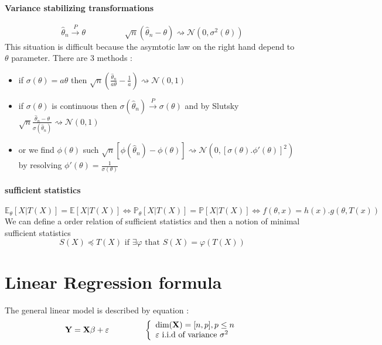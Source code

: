 \documentclass[a4paper,10pt]{article}
\begin{document}
\paragraph{Variance stabilizing transformations}
\[
\widehat{\theta}_n \xrightarrow{P} \theta
\hspace{2cm}
\sqrt{n}(\widehat{\theta}_n - \theta) \rightsquigarrow   \mathcal{N}(0,\sigma^{2}(\theta))
\]
This situation is difficult because the asymtotic law on the right hand depend to $\theta$ parameter. There are 3 methods :
\begin{itemize}
 \item if $\sigma(\theta)=a\theta$ then $\sqrt{n}(\frac{\widehat{\theta}_n}{a\theta} - \frac{1}{a}) \rightsquigarrow   \mathcal{N}(0,1)$
 \item if $\sigma(\theta)$ is continuous then $\sigma(\widehat{\theta}_n) \xrightarrow{P} \sigma(\theta)$ and by Slutsky
$\sqrt{n}\frac{\widehat{\theta}_n - \theta}{\sigma(\widehat{\theta}_n)} \rightsquigarrow   \mathcal{N}(0,1)$
 \item or we find $\phi(\theta)$ such $\sqrt{n}[\phi(\widehat{\theta}_n) - \phi(\theta)] \rightsquigarrow   \mathcal{N}(0,[\sigma(\theta).\phi'(\theta)]^2)$
by resolving $\phi'(\theta) = \frac{1}{\sigma(\theta)}$
\end{itemize}
\paragraph{sufficient statistics}
\[
\mathbb{E}_{\theta}[X|T(X)] = \mathbb{E}[X|T(X)]  \Longleftrightarrow
\mathbb{P}_{\theta}[X|T(X)] = \mathbb{P}[X|T(X)]  \Longleftrightarrow 
f(\theta, x) = h(x).g(\theta, T(x))
\]
We can define a order relation of sufficient statistics and then a notion of minimal sufficient statistics
\[
S(X) \preccurlyeq T(X) \text{ if } \exists \varphi \text{ that } S(X) = \varphi(T(X))
\]


\section{Linear Regression formula}
The general linear model is described by equation :
\[
\textbf{Y} = \textbf{X} \beta + \varepsilon    
\hspace{1.5cm} 
\left\{
\begin{array}{l}
 \text{dim}(\textbf{X})=[n,p] , p\leq n \\
 \varepsilon \text{  i.i.d of variance }\sigma^2
\end{array}\right. 
\]
\end{document}
